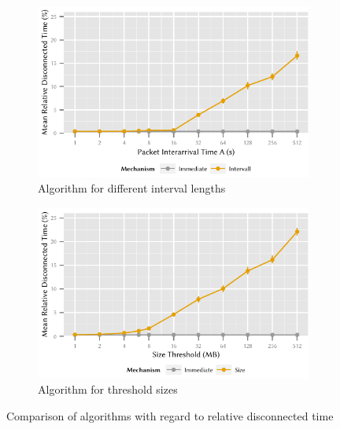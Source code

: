 \begin{figure}
	\begin{subfigure}[b]{\textwidth}
	\centering
	\includegraphics{application/cloud_file_synchronization/numerical_evaluation/figures/interval_disconnected}
	\caption{Algorithm \algointerval for different interval lengths}\label{fig:application:cloud_file_synchronisation:numerical_evaluation:disconnected:disconnected:interval}
	\end{subfigure} 
	\begin{subfigure}[b]{\textwidth}
	\centering
	\includegraphics{application/cloud_file_synchronization/numerical_evaluation/figures/size_disconnected}
	\caption{Algorithm \algosize for threshold sizes}\label{fig:application:cloud_file_synchronisation:numerical_evaluation:disconnected:disconnected:size}
	\end{subfigure}

	\caption{Comparison of algorithms with regard to relative disconnected time \relativeDisconnectedTime}\label{fig:application:cloud_file_synchronisation:numerical_evaluation:disconnected:disconnected}
\end{figure}

